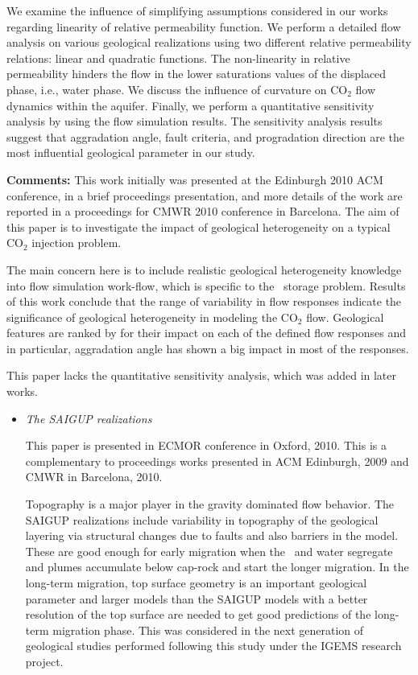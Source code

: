 {We examine the influence of simplifying assumptions considered in our works
regarding linearity of relative permeability function. We perform a detailed
flow analysis on various geological realizations using two different relative
permeability relations: linear and quadratic functions. The non-linearity in
relative permeability hinders the flow in the lower saturations values of the
displaced phase, i.e., water phase. We discuss the influence of curvature on
$\mbox{CO}_2$ flow dynamics within the aquifer. Finally, we perform a quantitative sensitivity analysis by using the flow simulation results. The sensitivity analysis results suggest that aggradation angle, fault criteria, and progradation direction are the most influential geological parameter in our study.

\vspace{0.5cm}
\noindent\textbf{Comments:}
This work initially was presented at the  Edinburgh 2010 ACM conference, in a
brief proceedings presentation, and more details of the work are reported in a
proceedings for CMWR 2010 conference in Barcelona. The aim of this paper is to
investigate the impact of geological heterogeneity on a typical $\mbox{CO}_2$
injection problem.

The main concern here is to include realistic geological heterogeneity knowledge
into flow simulation work-flow, which is specific to the \coo\ storage
problem. Results of this work conclude that the range of variability in flow
responses indicate the significance of geological heterogeneity in modeling the
$\mbox{CO}_2$ flow. Geological features are ranked by for their impact on each
of the defined flow responses and in particular, aggradation angle has shown a
big impact in most of the responses.

This paper lacks the quantitative sensitivity analysis, which was added in later works. 

\vspace{0.5cm}
\begin{itemize}

\item \textit{The SAIGUP realizations}
 
This paper is presented in ECMOR conference in Oxford, 2010. This is a
complementary to proceedings works presented in ACM Edinburgh, 2009 and CMWR in
Barcelona, 2010. 

Topography is a major player in the gravity dominated flow behavior. The SAIGUP
realizations include variability in topography of the geological layering via
structural changes due to faults and also barriers in the model. These are good
enough for early migration when the \coo\ and water segregate and plumes
accumulate below cap-rock and start the longer migration. In the long-term
migration, top surface geometry is an important geological parameter and
larger models than the SAIGUP models with a better resolution of the top surface
are needed to get good predictions of the long-term migration phase. This
was considered in the next generation of geological studies performed following
this study \cite{syversveenstudy,nilsen2012impact} under the IGEMS research
project.


\end{itemize}}
